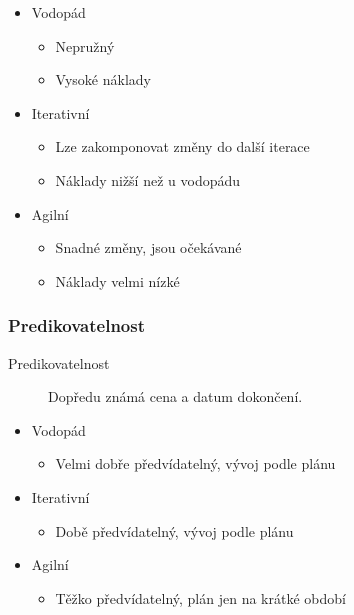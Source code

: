       \begin{itemize}
        \item Vodopád
          \begin{itemize}
            \item Nepružný
            \item Vysoké náklady
          \end{itemize}
        \item Iterativní
          \begin{itemize}
            \item Lze zakomponovat změny do další iterace
            \item Náklady nižší než u vodopádu
          \end{itemize}
        \item Agilní
          \begin{itemize}
            \item Snadné změny, jsou očekávané
            \item Náklady velmi nízké
          \end{itemize}
      \end{itemize}

      \subsubsection{Predikovatelnost}
        \begin{description}
          \item[Predikovatelnost] Dopředu známá cena a datum dokončení.
        \end{description}

        \begin{itemize}
          \item Vodopád
            \begin{itemize}
              \item Velmi dobře předvídatelný, vývoj podle plánu
            \end{itemize}
          \item Iterativní
            \begin{itemize}
              \item Době předvídatelný, vývoj podle plánu
            \end{itemize}
          \item Agilní
            \begin{itemize}
              \item Těžko předvídatelný, plán jen na krátké období
            \end{itemize}
        \end{itemize}

